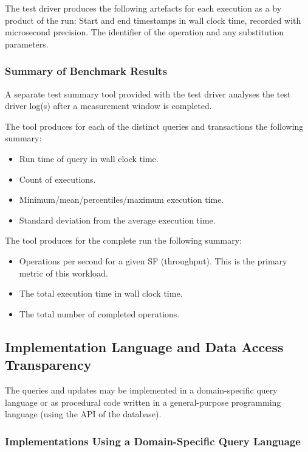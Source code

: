 The test driver produces the following artefacts for each execution as a by product of the run: Start and end timestamps in wall clock time, recorded with microsecond precision. The identifier of the operation and any substitution parameters.


\subsubsection{Summary of Benchmark Results}
\label{sec:performance-metrics}
A separate test summary tool provided with the test driver analyses the test driver log(s) after a measurement window is completed. 

The tool produces for each of the distinct queries and transactions the following summary:
\begin{itemize}
    \item Run time of query in wall clock time.
    \item Count of executions.
    \item Minimum/mean/percentiles/maximum execution time.
    \item Standard deviation from the average execution time.
\end{itemize}
The tool produces for the complete run the following summary:
\begin{itemize}
    \item Operations per second for a given SF (throughput). This is the primary metric of this workload.
    \item The total execution time in wall clock time.
    \item The total number of completed operations.
\end{itemize}


\subsection{Implementation Language and Data Access Transparency}

The queries and updates may be implemented in a domain-specific query language or as procedural code written in a general-purpose programming language (\eg using the API of the database).

\subsubsection{Implementations Using a Domain-Specific Query Language}
\label{sec:snb-domain-specific-query-language}

